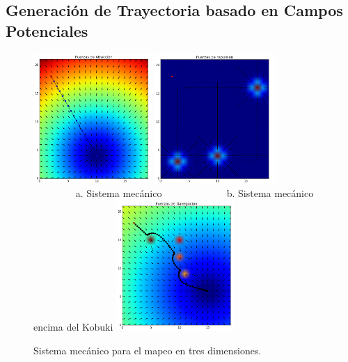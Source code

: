 \subsection{Generaci\'on de Trayectoria basado en Campos Potenciales}
\begin{figure}%
  \centering \footnotesize
  \includegraphics[width=0.40\textwidth]{images/f_attrac.png}
  \includegraphics[width=0.41\textwidth]{images/f_reps.png}
  \\ $\qquad\qquad$ a. Sistema mecánico  $\qquad\qquad\qquad$  b. Sistema mecánico encima del Kobuki
  \includegraphics[width=0.40\textwidth]{images/f_nav.png}
  \captionsetup{font=footnotesize}
  \caption{Sistema mec\'anico para el mapeo en tres dimensiones.}
\end{figure}
